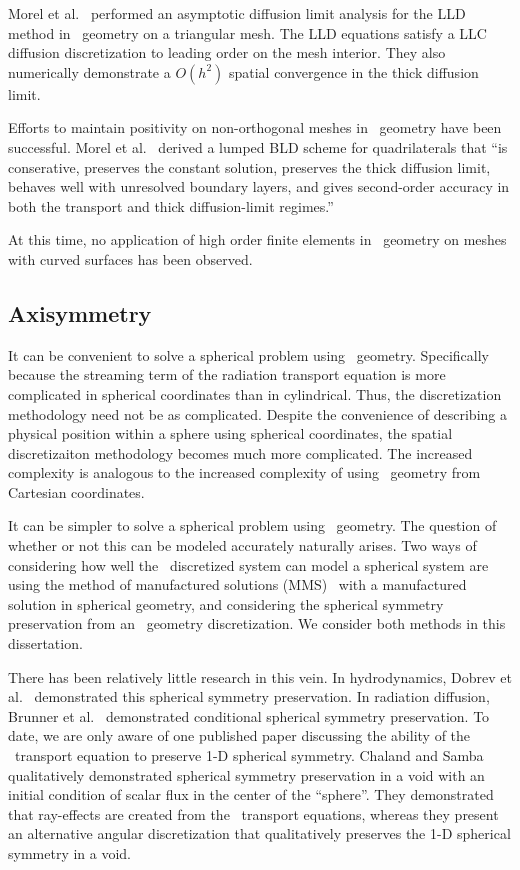 \documentclass{article}
\begin{document}
Morel et al.~\cite{MorelLLDrz} performed an asymptotic diffusion limit analysis for the LLD method in \RZ\ geometry on a triangular mesh. The LLD equations satisfy a LLC diffusion discretization to leading order on the mesh interior. They also numerically demonstrate a $O(h^2)$ spatial convergence in the thick diffusion limit.

Efforts to maintain positivity on non-orthogonal meshes in \RZ\ geometry have been successful. Morel et al.~\cite{MorelLBLD} derived a lumped BLD scheme for quadrilaterals that ``is conserative, preserves the constant solution, preserves the thick diffusion limit, behaves well with unresolved boundary layers, and gives second-order accuracy in both the transport and thick diffusion-limit regimes.''

At this time, no application of high order finite elements in \RZ\ geometry on meshes with curved surfaces has been observed.

\subsection{Axisymmetry}
It can be convenient to solve a spherical problem using \RZ\ geometry. Specifically because the streaming term of the radiation transport equation is more complicated in spherical coordinates than in cylindrical. Thus, the discretization methodology need not be as complicated. Despite the convenience of describing a physical position within a sphere using spherical coordinates, the spatial discretizaiton methodology becomes much more complicated. The increased complexity is analogous to the increased complexity of using \RZ\ geometry from Cartesian coordinates.

It can be simpler to solve a spherical problem using \RZ\ geometry. The question of whether or not this can be modeled accurately naturally arises. Two ways of considering how well the \RZ\ discretized system can model a spherical system are using the method of manufactured solutions (MMS)~\cite{Lingus} with a manufactured solution in spherical geometry, and considering the spherical symmetry preservation from an \RZ\ geometry discretization. We consider both methods in this dissertation.

There has been relatively little research in this vein. In hydrodynamics, Dobrev et al.~\cite{DobrevHOAxisymmetric} demonstrated this spherical symmetry preservation. In radiation diffusion, Brunner et al.~\cite{BrunnerSphericalsymmetry} demonstrated conditional spherical symmetry preservation. To date, we are only aware of one published paper discussing the ability of the \RZ\ transport equation to preserve 1-D spherical symmetry. Chaland and Samba~\cite{Chaland2016SphericalSymmetry} qualitatively demonstrated spherical symmetry preservation in a void with an initial condition of scalar flux in the center of the ``sphere''. They demonstrated that ray-effects are created from the \SN\ transport equations, whereas they present an alternative angular discretization that qualitatively preserves the 1-D spherical symmetry in a void.
\end{document}
